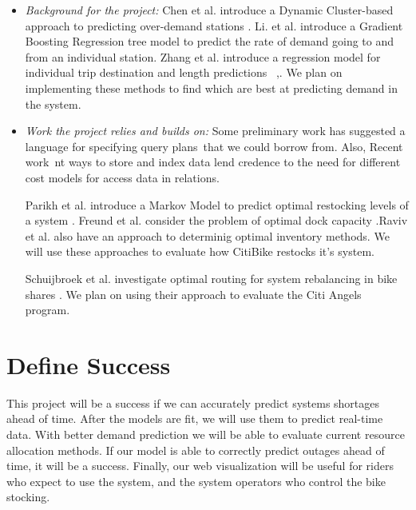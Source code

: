 \documentclass{proc}
\begin{document}
\begin{itemize}
\item \emph{Background for the project:} Chen et al. introduce a Dynamic Cluster-based approach to predicting over-demand stations \cite{chen}.  Li. et al. introduce a Gradient Boosting Regression tree model to predict the rate of demand going to and from an individual station.  Zhang et al. introduce a regression model for individual trip destination and length predictions~ \cite{zhang},. We plan on implementing these methods to find which are best at predicting demand in the system.





\item \emph{Work the project relies and builds on: } Some preliminary work has suggested a language for specifying query plans~that we could borrow from.  Also, Recent work~nt ways to store and index data lend credence to the need for different cost models for access data in relations.



Parikh et al. introduce a Markov Model to predict optimal restocking levels of a system \cite{parikh}. Freund et al. consider the problem of optimal dock capacity \cite{freund}.Raviv et al. also have an approach to determinig optimal inventory methods. We will use these approaches to evaluate how CitiBike restocks it's system.

Schuijbroek et al. investigate optimal routing for system rebalancing in bike shares \cite{schu}. We plan on using their approach to evaluate the Citi Angels program.
\end{itemize}


\section{Define Success}


This project will be a success if we can accurately predict systems shortages ahead of time. After the models are fit, we will use them to predict real-time data. With better demand prediction we will be able to evaluate current resource allocation methods. If our model is able to correctly predict outages ahead of time, it will be a success. Finally, our web visualization will be useful for riders who expect to use the system, and the system operators who control the bike stocking.
\end{document}
